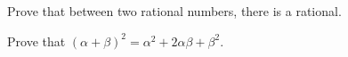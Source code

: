 \begin{exercise}
\item Prove that between two rational numbers, there is a rational.
\item Prove that $(\alpha + \beta)^2 = \alpha^2 + 2 \alpha \beta + \beta^2$.
\end{exercise}